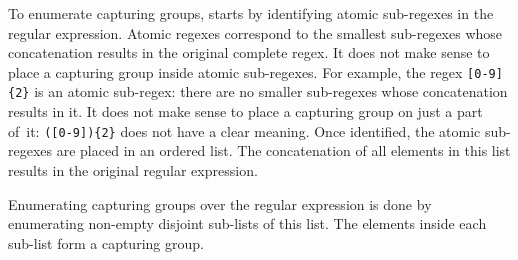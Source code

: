 To enumerate capturing groups, \Forest starts by identifying atomic sub-regexes in the regular expression.
Atomic regexes correspond to the smallest sub-regexes whose concatenation results in the original complete regex.
It does not make sense to place a capturing group inside atomic sub-regexes. For example, the regex \verb![0-9]{2}! is an atomic sub-regex: there are no smaller sub-regexes whose concatenation results in it. It does not make sense to place a capturing group on just a part of~it: \verb!([0-9]){2}! does not have a clear meaning.
Once identified, the atomic sub-regexes are placed in an ordered list. The concatenation of all elements in this list results in the original regular expression.

Enumerating capturing groups over the regular expression is done by enumerating non-empty disjoint sub-lists of this list. The elements inside each sub-list form a capturing group.

